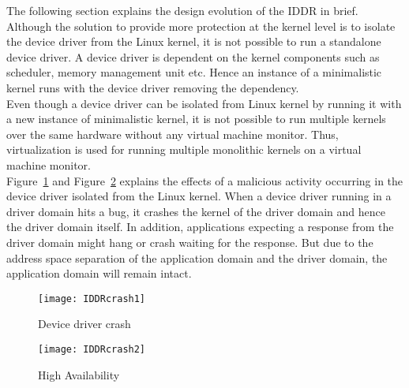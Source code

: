 The following section explains the design evolution of the IDDR in brief. 
\\
Although the solution to provide more protection at the kernel level is to isolate the device driver from the Linux kernel, it is not possible to run a standalone device driver. A device driver is dependent on the kernel components such as scheduler, memory management unit etc. Hence an instance of a minimalistic kernel runs with the device driver removing the dependency. 
\\
Even though a device driver can be isolated from Linux kernel by running it with a new instance of minimalistic kernel, it is not possible to run multiple kernels over the same hardware without any virtual machine monitor. Thus, virtualization is used for running multiple monolithic kernels on a virtual machine monitor.
\\
Figure~\ref{fig:driver crash} and Figure~\ref{fig:high avail} explains the effects of a malicious activity occurring in the device driver isolated from the Linux kernel. When a device driver running in a driver domain hits a bug, it crashes the kernel of the driver domain and hence the driver domain itself. In addition, applications expecting a response from the driver domain might hang or crash waiting for the response. But due to the address space separation of the application domain and the driver domain, the application domain will remain intact.   
\begin{figure}[!ht]
\centering
\texttt{[image: IDDRcrash1]}
\caption{Device driver crash}
\label{fig:driver crash}
\end{figure}
\begin{figure}[!ht]
\centering
\texttt{[image: IDDRcrash2]}
\caption{High Availability}
\label{fig:high avail}
\end{figure}
\pagebreak
    
